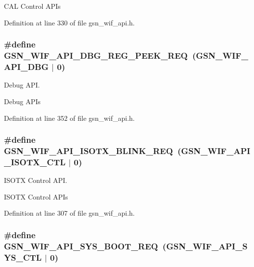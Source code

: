 CAL Control APIs 

Definition at line 330 of file gsn\_\-wif\_\-api.h.

\hypertarget{a00636_ga141fe1f244ec03a374f1efba9524991c}{
\subsubsection[{GSN\_\-WIF\_\-API\_\-DBG\_\-REG\_\-PEEK\_\-REQ}]{\setlength{\rightskip}{0pt plus 5cm}\#define GSN\_\-WIF\_\-API\_\-DBG\_\-REG\_\-PEEK\_\-REQ~(GSN\_\-WIF\_\-API\_\-DBG $|$ 0)}}
\label{a00636_ga141fe1f244ec03a374f1efba9524991c}


Debug API. 

Debug APIs 

Definition at line 352 of file gsn\_\-wif\_\-api.h.

\hypertarget{a00636_gaaf48f3ebb3fabb793cc8b5663aff7251}{
\subsubsection[{GSN\_\-WIF\_\-API\_\-ISOTX\_\-BLINK\_\-REQ}]{\setlength{\rightskip}{0pt plus 5cm}\#define GSN\_\-WIF\_\-API\_\-ISOTX\_\-BLINK\_\-REQ~(GSN\_\-WIF\_\-API\_\-ISOTX\_\-CTL $|$ 0)}}
\label{a00636_gaaf48f3ebb3fabb793cc8b5663aff7251}


ISOTX Control API. 

ISOTX Control APIs 

Definition at line 307 of file gsn\_\-wif\_\-api.h.

\hypertarget{a00636_ga35490aa95424208d771f9ce5466c4dc2}{
\subsubsection[{GSN\_\-WIF\_\-API\_\-SYS\_\-BOOT\_\-REQ}]{\setlength{\rightskip}{0pt plus 5cm}\#define GSN\_\-WIF\_\-API\_\-SYS\_\-BOOT\_\-REQ~(GSN\_\-WIF\_\-API\_\-SYS\_\-CTL $|$ 0)}}
\label{a00636_ga35490aa95424208d771f9ce5466c4dc2}


